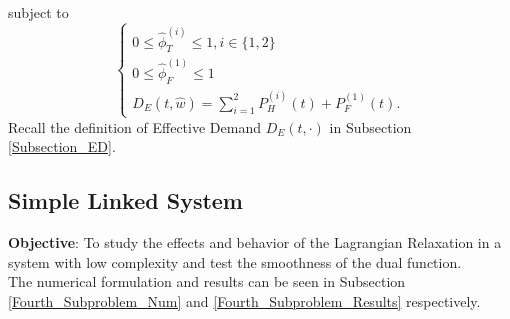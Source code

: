 subject to
\begin{equation}
\begin{cases}
0\leq\hat{\phi}^{(i)}_T\leq1,i\in\{1,2\}\\
0\leq\hat{\phi}^{(1)}_F\leq1\\
D_E(t,\hat{w})=\sum_{i=1}^2P_H^{(i)}(t)+P_F^{(1)}(t).
\end{cases}
\end{equation}
Recall the definition of Effective Demand $D_E(t,\cdot)$ in Subsection \ref{Subsection_ED}.

\subsection{Simple Linked System} \label{Fourth_Subproblem}

\textbf{Objective}: To study the effects and behavior of the Lagrangian Relaxation in a system with low complexity and test the smoothness of the dual function.\\

The numerical formulation and results can be seen in Subsection \ref{Fourth_Subproblem_Num} and \ref{Fourth_Subproblem_Results} respectively.\\

